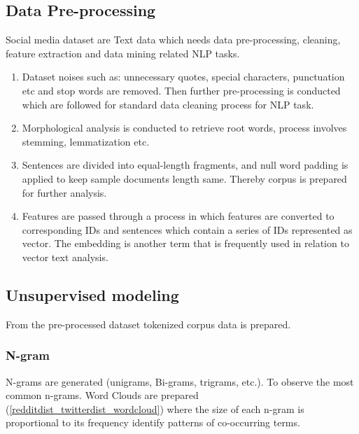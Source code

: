 \documentclass[sn-mathphys,Numbered]{sn-jnl}%
\theoremstyle{thmstyleone}%
\theoremstyle{thmstyletwo}%
\theoremstyle{thmstylethree}%
\begin{document}
\subsection{Data Pre-processing}\label{data_preprocessing}
Social media dataset are Text data which needs data pre-processing, cleaning, feature extraction and data mining related NLP tasks.
\begin{enumerate}[label=(\roman*)]
\item Dataset noises such as: unnecessary quotes, special characters, punctuation etc and stop words are removed. Then further pre-processing is conducted which are followed for standard data cleaning process for NLP task. 
\item Morphological analysis is conducted to retrieve root words, process involves stemming, lemmatization etc.
\item Sentences are divided into equal-length fragments, and null word padding is applied to keep sample documents length same. Thereby corpus is prepared for further analysis.
\item Features are passed through a process in which features are converted to corresponding IDs and sentences which contain a series of IDs represented as vector. The embedding is another term that is frequently used in relation to vector text analysis. 
\end{enumerate}

\subsection{Unsupervised modeling}
From the pre-processed dataset tokenized corpus data is prepared. 
\subsubsection{N-gram} 
N-grams are generated (unigrams, Bi-grams, trigrams, etc.). To observe the most common n-grams. Word Clouds are prepared (\ref{redditdist_twitterdist_wordcloud}) where the size of each n-gram is proportional to its frequency identify patterns of co-occurring terms. 
\end{document}
